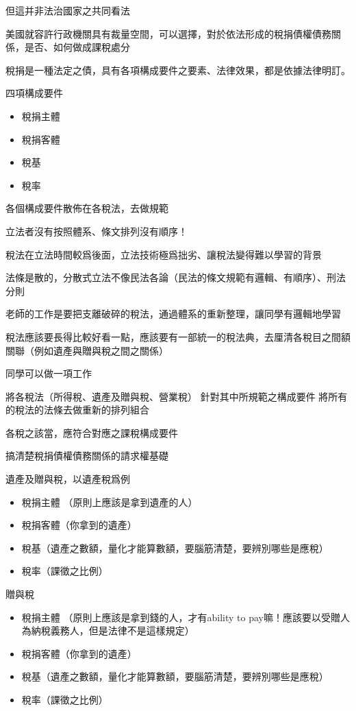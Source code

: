 \documentclass[]{ctexbook}
\providecommand{\tightlist}{%
  \setlength{\itemsep}{0pt}\setlength{\parskip}{0pt}}
\begin{document}
但這并非法治國家之共同看法

美國就容許行政機關具有裁量空間，可以選擇，對於依法形成的稅捐債權債務關係，是否、如何做成課稅處分

稅捐是一種法定之債，具有各項構成要件之要素、法律效果，都是依據法律明訂。

四項構成要件

\begin{itemize}
\tightlist
\item
  稅捐主體
\item
  稅捐客體
\item
  稅基
\item
  稅率
\end{itemize}

各個構成要件散佈在各稅法，去做規範

立法者沒有按照體系、條文排列沒有順序！

稅法在立法時間較爲後面，立法技術極爲拙劣、讓稅法變得難以學習的背景

法條是散的，分散式立法不像民法各論（民法的條文規範有邏輯、有順序）、刑法分則

老師的工作是要把支離破碎的稅法，通過體系的重新整理，讓同學有邏輯地學習

稅法應該要長得比較好看一點，應該要有一部統一的稅法典，去厘清各稅目之間額關聯（例如遺產與贈與稅之間之關係）

同學可以做一項工作

將各稅法（所得稅、遺產及贈與稅、營業稅）
針對其中所規範之構成要件
將所有的稅法的法條去做重新的排列組合

各稅之該當，應符合對應之課稅構成要件

搞清楚稅捐債權債務關係的請求權基礎

遺產及贈與稅，以遺產稅爲例

\begin{itemize}
\tightlist
\item
  稅捐主體 （原則上應該是拿到遺產的人）
\item
  稅捐客體（你拿到的遺產）
\item
  稅基（遺產之數額，量化才能算數額，要腦筋清楚，要辨別哪些是應稅）
\item
  稅率（課徵之比例）
\end{itemize}

贈與稅

\begin{itemize}
\tightlist
\item
  稅捐主體 （原則上應該是拿到錢的人，才有ability to pay嘛！應該要以受贈人為納稅義務人，但是法律不是這樣規定）
\item
  稅捐客體（你拿到的遺產）
\item
  稅基（遺產之數額，量化才能算數額，要腦筋清楚，要辨別哪些是應稅）
\item
  稅率（課徵之比例）
\end{itemize}
\end{document}
